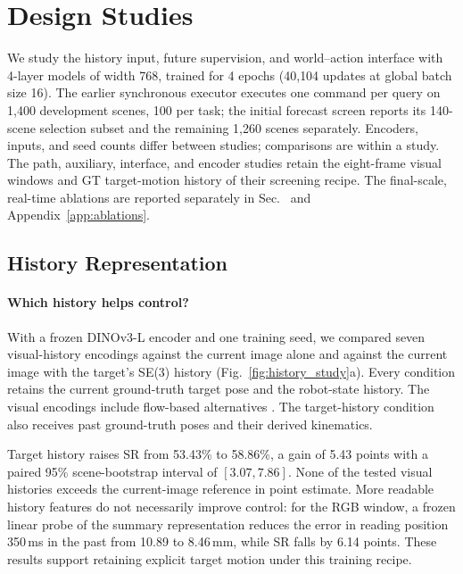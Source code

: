 \section{Design Studies}
\label{app:design}
\suppressfloats[t]
We study the history input, future supervision, and world--action interface with
4-layer models of width 768, trained for 4 epochs (40{,}104 updates at global batch
size 16). The earlier synchronous executor executes one command per query on
1{,}400 development scenes, 100 per task; the initial forecast screen reports its
140-scene selection subset and the remaining 1{,}260 scenes separately. Encoders,
inputs, and seed counts differ between studies; comparisons are within a study.
The path, auxiliary, interface, and encoder studies retain the
eight-frame visual windows and GT target-motion history of their screening recipe.
The final-scale, real-time ablations are reported separately in
Sec.~ and Appendix~\ref{app:ablations}.

\subsection{History Representation}
\label{app:design_remember}


\paragraph{Which history helps control?}
With a frozen DINOv3-L encoder \cite{dinov3} and one training seed, we compared
seven visual-history encodings against the current image alone and against the
current image with the target's SE(3) history (Fig.~\ref{fig:history_study}a).
Every condition retains the current ground-truth target pose and the robot-state
history. The visual encodings include flow-based alternatives
\cite{farneback,dynamicwam}. The target-history condition
also receives past ground-truth poses and their derived kinematics.

Target history raises SR from 53.43\% to 58.86\%, a gain of 5.43 points with a
paired 95\% scene-bootstrap interval of $[3.07,7.86]$. None of the tested visual
histories exceeds the current-image reference in point estimate. More readable
history features do not necessarily improve control: for the RGB window, a frozen
linear probe of the summary representation reduces the error in reading position
350\,ms in the past from 10.89 to 8.46\,mm, while SR falls by 6.14 points. These
results support retaining explicit target motion under this training recipe.

